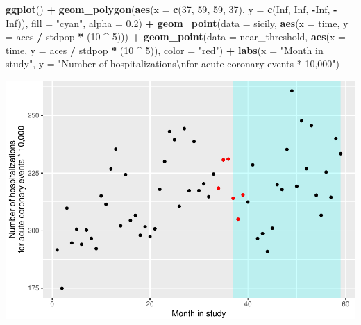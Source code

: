 \documentclass[
]{book}
\newenvironment{Shaded}{\begin{snugshade}}{\end{snugshade}}
\newcommand{\CharTok}[1]{\textcolor[rgb]{0.31,0.60,0.02}{#1}}
\newcommand{\DataTypeTok}[1]{\textcolor[rgb]{0.13,0.29,0.53}{#1}}
\newcommand{\DecValTok}[1]{\textcolor[rgb]{0.00,0.00,0.81}{#1}}
\newcommand{\FloatTok}[1]{\textcolor[rgb]{0.00,0.00,0.81}{#1}}
\newcommand{\KeywordTok}[1]{\textcolor[rgb]{0.13,0.29,0.53}{\textbf{#1}}}
\newcommand{\NormalTok}[1]{#1}
\newcommand{\OperatorTok}[1]{\textcolor[rgb]{0.81,0.36,0.00}{\textbf{#1}}}
\newcommand{\OtherTok}[1]{\textcolor[rgb]{0.56,0.35,0.01}{#1}}
\newcommand{\StringTok}[1]{\textcolor[rgb]{0.31,0.60,0.02}{#1}}
\begin{document}
\begin{Shaded}
\begin{Highlighting}[]
\KeywordTok{ggplot}\NormalTok{() }\OperatorTok{+}\StringTok{ }
\StringTok{  }\KeywordTok{geom_polygon}\NormalTok{(}\KeywordTok{aes}\NormalTok{(}\DataTypeTok{x =} \KeywordTok{c}\NormalTok{(}\DecValTok{37}\NormalTok{, }\DecValTok{59}\NormalTok{, }\DecValTok{59}\NormalTok{, }\DecValTok{37}\NormalTok{), }
                   \DataTypeTok{y =} \KeywordTok{c}\NormalTok{(}\OtherTok{Inf}\NormalTok{, }\OtherTok{Inf}\NormalTok{, }\OperatorTok{-}\OtherTok{Inf}\NormalTok{, }\OperatorTok{-}\OtherTok{Inf}\NormalTok{)), }
               \DataTypeTok{fill =} \StringTok{"cyan"}\NormalTok{, }\DataTypeTok{alpha =} \FloatTok{0.2}\NormalTok{) }\OperatorTok{+}\StringTok{ }
\StringTok{  }\KeywordTok{geom_point}\NormalTok{(}\DataTypeTok{data =}\NormalTok{ sicily, }\KeywordTok{aes}\NormalTok{(}\DataTypeTok{x =}\NormalTok{ time, }\DataTypeTok{y =}\NormalTok{ aces }\OperatorTok{/}\StringTok{ }\NormalTok{stdpop }\OperatorTok{*}\StringTok{ }\NormalTok{(}\DecValTok{10} \OperatorTok{^}\StringTok{ }\DecValTok{5}\NormalTok{))) }\OperatorTok{+}\StringTok{ }
\StringTok{  }\KeywordTok{geom_point}\NormalTok{(}\DataTypeTok{data =}\NormalTok{ near_threshold, }
             \KeywordTok{aes}\NormalTok{(}\DataTypeTok{x =}\NormalTok{ time, }\DataTypeTok{y =}\NormalTok{ aces }\OperatorTok{/}\StringTok{ }\NormalTok{stdpop }\OperatorTok{*}\StringTok{ }\NormalTok{(}\DecValTok{10} \OperatorTok{^}\StringTok{ }\DecValTok{5}\NormalTok{)), }
             \DataTypeTok{color =} \StringTok{"red"}\NormalTok{) }\OperatorTok{+}\StringTok{ }
\StringTok{  }\KeywordTok{labs}\NormalTok{(}\DataTypeTok{x =} \StringTok{"Month in study"}\NormalTok{, }
       \DataTypeTok{y =} \StringTok{"Number of hospitalizations}\CharTok{\textbackslash{}n}\StringTok{for acute coronary events * 10,000"}\NormalTok{)}
\end{Highlighting}
\end{Shaded}

\includegraphics{adv_epi_analysis_files/figure-latex/unnamed-chunk-127-1.pdf}
\end{document}
